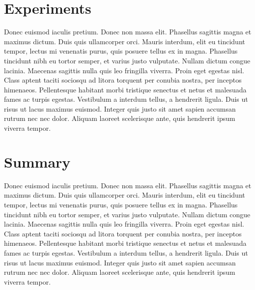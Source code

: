 \documentclass[format=acmsmall, review=false, screen=true]{acmart}
\begin{document}
\section{Experiments}

Donec euismod iaculis pretium. Donec non massa elit. Phasellus sagittis magna et maximus dictum. Duis quis ullamcorper orci. Mauris interdum, elit eu tincidunt tempor, lectus mi venenatis purus, quis posuere tellus ex in magna. Phasellus tincidunt nibh eu tortor semper, et varius justo vulputate. Nullam dictum congue lacinia. Maecenas sagittis nulla quis leo fringilla viverra. Proin eget egestas nisl. Class aptent taciti sociosqu ad litora torquent per conubia nostra, per inceptos himenaeos. Pellentesque habitant morbi tristique senectus et netus et malesuada fames ac turpis egestas. Vestibulum a interdum tellus, a hendrerit ligula. Duis ut risus ut lacus maximus euismod. Integer quis justo sit amet sapien accumsan rutrum nec nec dolor. Aliquam laoreet scelerisque ante, quis hendrerit ipsum viverra tempor.


\section{Summary}

Donec euismod iaculis pretium. Donec non massa elit. Phasellus sagittis magna et maximus dictum. Duis quis ullamcorper orci. Mauris interdum, elit eu tincidunt tempor, lectus mi venenatis purus, quis posuere tellus ex in magna. Phasellus tincidunt nibh eu tortor semper, et varius justo vulputate. Nullam dictum congue lacinia. Maecenas sagittis nulla quis leo fringilla viverra. Proin eget egestas nisl. Class aptent taciti sociosqu ad litora torquent per conubia nostra, per inceptos himenaeos. Pellentesque habitant morbi tristique senectus et netus et malesuada fames ac turpis egestas. Vestibulum a interdum tellus, a hendrerit ligula. Duis ut risus ut lacus maximus euismod. Integer quis justo sit amet sapien accumsan rutrum nec nec dolor. Aliquam laoreet scelerisque ante, quis hendrerit ipsum viverra tempor.
\end{document}
